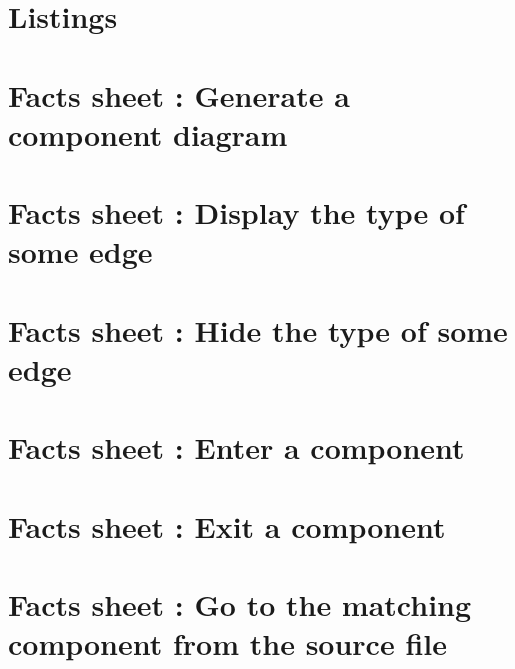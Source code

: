 \documentclass[a4paper,11pt]{report}
\begin{document}

\tableofcontents
\newpage









\printbibliography

\begin{appendices}

\chapter{Listings}
    \label{cha:appendix-lst}


\chapter{Facts sheet : Generate a component diagram}


\chapter{Facts sheet : Display the type of some edge}


\chapter{Facts sheet : Hide the type of some edge}


\chapter{Facts sheet : Enter a component}


\chapter{Facts sheet : Exit a component}


\chapter{Facts sheet : Go to the matching component from the source file}



\end{appendices}
\end{document}
